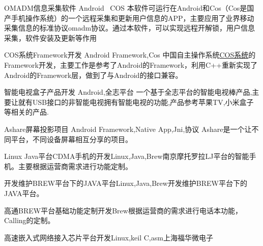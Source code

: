\documentclass[11pt,a4paper]{moderncv}
\begin{document}
\cventry{}
{OMADM信息采集软件}
{Android \, COS}
{}{}{本软件可运行在Android和Cos（Cos是国产手机操作系统）的一个远程采集和更新用户信息的APP，主要应用了业界移动采集信息的标准协议omadm协议。通过本软件，可以实现远程开解锁，用户信息采集，软件安装及更新等作用 }


\cventry{}
{COS系统Framework开发}
{Android Framework,Cos}
{}{}
{中国自主操作系统\href{http://www.china-cos.com/site/index.html}{COS系统}的Framework开发，主要工作是参考了Android的Framework，利用C++重新实现了Android的Framework层，做到了与Android的接口兼容。 }

\cventry{}
{智能电视盒子产品开发}
{Android,全志平台}
{}{}{一个基于全志平台的智能电视棒产品,主要让就有USB接口的非智能电视拥有智能电视的功能,产品参考苹果TV,小米盒子等相关的产品. }

\cventry{}
{Ashare屏幕投影项目}
{Android Framework,Native App,Jni,协议}
{}{}
{Ashare是一个让不同平台，不同设备屏幕相互分享的项目。      }

%
%

{Linux Java平台CDMA手机的开发}{Linux,Java,Brew}{南京摩托罗拉}{}{LJ平台的智能手机。主要根据运营商需求进行功能定制。
}

\cventry{}
{开发维护BREW平台下的JAVA平台}{Linux,Java,Brew}{}{}{开发维护BREW平台下的JAVA平台。
}

\cventry{}
{高通BREW平台基础功能定制开发}{Brew}{}{}{根据运营商的需求进行电话本功能，Calling的定制。
}

{高速嵌入式网络接入芯片平台开发}{Linux,keil C,asm}{上海福华微电子}{}{
}
\end{document}

